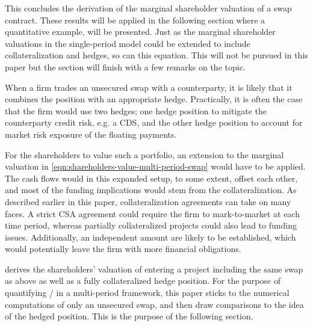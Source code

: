 \documentclass[main.tex]{subfiles}
\begin{document}
        This concludes the derivation of the marginal shareholder valuation of a swap contract.
        These results will be applied in the following section where a quantitative example,
        will be presented.
        Just as the marginal shareholder valuations in the single-period model
        could be extended to include collateralization and hedges, so can this equation.
        This will not be pursued in this paper 
        but the section will finish with a few remarks on the topic.

        When a firm trades an unsecured swap with a counterparty,
        it is likely that it combines the position with an appropriate hedge.
        Practically, it is often the case that the firm would use two hedges;
        one hedge position to mitigate the counterparty credit risk, e.g. a CDS,
        and the other hedge position to account for market risk exposure of the floating payments.

        For the shareholders to value such a portfolio,
        an extension to the marginal valuation in 
        \cref{eqn:shareholders-value-multi-period-swap} would have to be applied.
        The cash flows would in this expanded setup, to some extent, offset each other,
        and most of the funding implications would stem from the collateralization.
        As described earlier in this paper, collateralization agreements can take on many faces.
        A strict CSA agreement could require the firm to mark-to-market at each time period,
        whereas partially collateralized projects could also lead to funding issues.
        Additionally, an independent amount are likely to be established,
        which would potentially leave the firm with more financial obligations.

        \textcite{ADS2018} derives the shareholders' valuation of entering a project 
        including the same swap as above as well as a fully collateralized hedge position.
        For the purpose of quantifying \FVA/ in a multi-period framework,
        this paper sticks to the numerical computations of only an unsecured swap,
        and then draw comparisons to the idea of the hedged position.
        This is the purpose of the following section.
        
\end{document}
